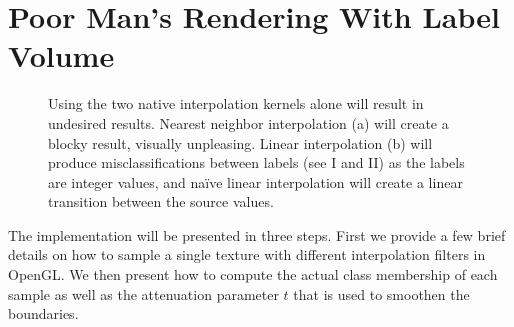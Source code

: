 \documentclass{egpubl}
\begin{document}
\section{Poor Man's Rendering With Label Volume}
\begin{figure}
	\centering
	\caption{Using the two native interpolation kernels alone will result in undesired results. Nearest neighbor interpolation (a) will create a blocky result, visually unpleasing. Linear interpolation (b) will produce misclassifications between labels (see I and II) as the labels are integer values, and na\"ive linear interpolation will create a linear transition between the source values.}
\end{figure}


The implementation will be presented in three steps. First we provide a few brief details on how to sample a single texture with different interpolation filters in OpenGL. We then present how to compute the actual class membership of each sample as well as the attenuation parameter $t$ that is used to smoothen the boundaries. 
\end{document}
